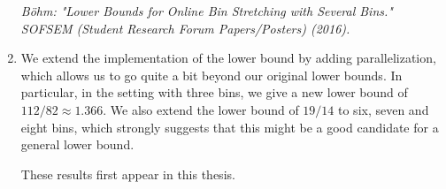 \begin{enumerate}
\noindent\textit{Böhm: "Lower Bounds for Online Bin Stretching with
Several Bins." SOFSEM (Student Research Forum Papers/Posters) (2016).}

\item We extend the implementation of the lower bound by adding
parallelization, which allows us to go quite a bit beyond our original
lower bounds. In particular, in the setting with three bins, we give a
new lower bound of $112/82 \approx 1.366$. We also extend the lower
bound of $19/14$ to six, seven and eight bins, which strongly
suggests that this might be a good candidate for a general lower
bound.

These results first appear in this thesis.

\end{enumerate}